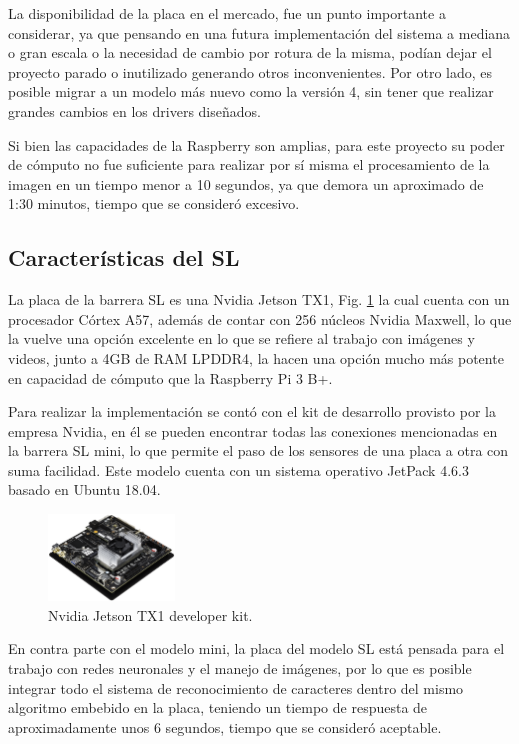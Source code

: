 La disponibilidad de la placa en el mercado, fue un punto importante a considerar, ya que pensando en una futura
implementación del sistema a mediana o gran escala o la necesidad de cambio por rotura de la misma, podían dejar el
proyecto parado o inutilizado generando otros inconvenientes. Por otro lado, es posible migrar a un modelo más nuevo como la versión 4, sin tener que realizar grandes cambios en los drivers diseñados.

Si bien las capacidades de la Raspberry son amplias, para este proyecto su poder de cómputo no fue suficiente para realizar por sí misma el procesamiento de la imagen en un tiempo menor a 10 segundos, ya que demora un aproximado de 1:30 minutos, tiempo que se consideró excesivo.

\subsection{Características del SL}

La placa de la barrera SL es una Nvidia Jetson TX1, Fig. \ref{fig:JTX1} la cual cuenta con un procesador Córtex A57, además de contar con 256 núcleos Nvidia Maxwell, lo que la vuelve una opción excelente en lo que se refiere al trabajo con imágenes y videos, junto a 4GB de RAM LPDDR4, la hacen una opción mucho más potente en capacidad de cómputo que la Raspberry Pi 3 B+.

Para realizar la implementación se contó con el kit de desarrollo provisto por la empresa Nvidia, en él se pueden encontrar todas las conexiones mencionadas en la barrera SL mini, lo que permite el paso de los sensores de una placa a otra con suma facilidad.
Este modelo cuenta con un sistema operativo JetPack 4.6.3 basado en Ubuntu 18.04.

\begin{figure}
    \centering
    \includegraphics[width=0.3\textwidth]{imgs/JTX1-developerkit.png}
    \caption{Nvidia Jetson TX1 developer kit.}
    \label{fig:JTX1}
\end{figure}


En contra parte con el modelo mini, la placa del modelo SL está pensada para el trabajo con redes neuronales y el manejo de imágenes, por lo que es posible integrar todo el sistema de reconocimiento de caracteres dentro del mismo algoritmo embebido en la placa, teniendo un tiempo de respuesta de aproximadamente unos 6 segundos, tiempo que se consideró aceptable.

